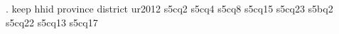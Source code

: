 . keep hhid province district ur2012 s5cq2 s5cq4 s5cq8 s5cq15 s5cq23 s5bq2 s5cq22 s5cq13 s5cq17 
{\smallskip}
